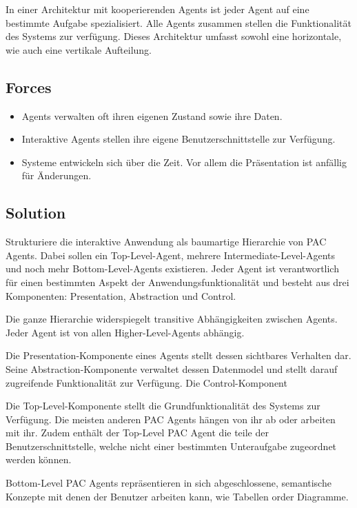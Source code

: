 In einer Architektur mit kooperierenden Agents ist jeder Agent auf eine bestimmte Aufgabe spezialisiert. Alle Agents zusammen stellen die Funktionalität des Systems zur verfügung. Dieses Architektur umfasst sowohl eine horizontale, wie auch eine vertikale Aufteilung.

\subsection*{Forces}


\begin{itemize}
	\item Agents verwalten oft ihren eigenen Zustand sowie ihre Daten.
	\item Interaktive Agents stellen ihre eigene Benutzerschnittstelle zur Verfügung.
	\item Systeme entwickeln sich über die Zeit. Vor allem die Präsentation ist anfällig für Änderungen.
\end{itemize}

\subsection*{Solution}


Strukturiere die interaktive Anwendung als baumartige Hierarchie von PAC Agents. Dabei sollen ein Top-Level-Agent, mehrere Intermediate-Level-Agents und noch mehr Bottom-Level-Agents existieren. Jeder Agent ist verantwortlich für einen bestimmten Aspekt der Anwendungsfunktionalität und besteht aus drei Komponenten: Presentation, Abstraction und Control.

Die ganze Hierarchie widerspiegelt transitive Abhängigkeiten zwischen Agents. Jeder Agent ist von allen Higher-Level-Agents abhängig.

Die Presentation-Komponente eines Agents stellt dessen sichtbares Verhalten dar. Seine Abstraction-Komponente verwaltet dessen Datenmodel und stellt darauf zugreifende Funktionalität zur Verfügung. Die Control-Komponent

Die Top-Level-Komponente stellt die Grundfunktionalität des Systems zur Verfügung. Die meisten anderen PAC Agents hängen von ihr ab oder arbeiten mit ihr. Zudem enthält der Top-Level PAC Agent die teile der Benutzerschnittstelle, welche nicht einer bestimmten Unteraufgabe zugeordnet werden können.

Bottom-Level PAC Agents repräsentieren in sich abgeschlossene, semantische Konzepte mit denen der Benutzer arbeiten kann, wie Tabellen order Diagramme.

